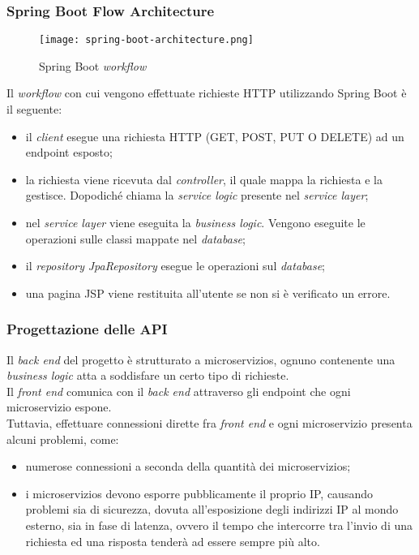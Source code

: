 \subsubsection{Spring Boot Flow Architecture}
\begin{figure}[H]
    \centering
    \texttt{[image: spring-boot-architecture.png]}
    \caption{Spring Boot \textit{workflow}}
\end{figure}
Il \textit{workflow} con cui vengono effettuate richieste HTTP utilizzando
Spring Boot è il seguente:
\begin{itemize}
    \item il \textit{client} esegue una richiesta HTTP (GET, POST, PUT O
          DELETE) ad un
          \gls{endpoint} esposto;
    \item la richiesta viene ricevuta dal \textit{controller}, il quale mappa
          la
          richiesta e la gestisce. Dopodiché chiama la \textit{service logic}
          presente
          nel \textit{service layer};
    \item nel \textit{service layer} viene eseguita la \textit{business logic}.
          Vengono eseguite le operazioni sulle classi mappate nel
          \textit{database};
    \item il \textit{repository} \textit{JpaRepository} esegue le operazioni
          sul \textit{database};
    \item una pagina \gls{JSP} viene restituita all'utente se non si è
          verificato un errore. \cite{site-microservizi}
\end{itemize}

\subsubsection{Progettazione delle API}
Il \textit{back end} del progetto è strutturato a \glspl{microservizio}, ognuno
contenente una \textit{business logic} atta a soddisfare un certo tipo di
richieste.\\
Il \textit{front end} comunica con il \textit{back end} attraverso gli
\gls{endpoint} che ogni \gls{microservizio} espone. \\
Tuttavia, effettuare connessioni dirette fra \textit{front end} e ogni
\gls{microservizio} presenta alcuni problemi, come:
\begin{itemize}
    \item numerose connessioni a seconda della quantità dei
          \glspl{microservizio};
    \item i \glspl{microservizio} devono esporre pubblicamente il proprio
          \gls{IP}, causando problemi sia di sicurezza, dovuta all'esposizione
          degli
          indirizzi \gls{IP} al mondo esterno, sia in fase di latenza, ovvero
          il tempo
          che intercorre tra l'invio di una richiesta ed una risposta tenderà
          ad essere
          sempre più alto. \cite{site-api-gateway}
\end{itemize}

